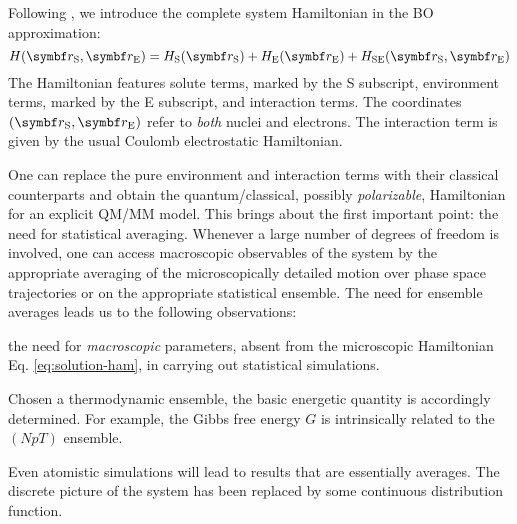 Following \citeauthor{Tomasi2007-es}, we introduce the complete system
Hamiltonian in the \acrshort{BO} approximation:\autocite{Tomasi2004-dc,
Tomasi2007-es}
\begin{equation}\label{eq:solution-ham}
 H(\vect{r}_\mathrm{S}, \vect{r}_\mathrm{E}) =
  H_\mathrm{S}(\vect{r}_\mathrm{S}) +  H_\mathrm{E}(\vect{r}_\mathrm{E})
+ H_\mathrm{SE}(\vect{r}_\mathrm{S}, \vect{r}_\mathrm{E})
\end{equation}
The Hamiltonian features solute terms, marked by the S subscript,
environment terms, marked by the E subscript, and interaction terms.
The coordinates $(\vect{r}_\mathrm{S}, \vect{r}_\mathrm{E})$ refer to
\emph{both} nuclei and electrons.
The interaction term is given by the usual Coulomb electrostatic
Hamiltonian.

One can replace the pure environment and interaction terms with their
classical counterparts and obtain the quantum/classical, possibly
\emph{polarizable}, Hamiltonian for an explicit \acrshort{QM}/\acrshort{MM} model.
This brings about the first important point: the need for statistical
averaging.
Whenever a large number of degrees of freedom is involved, one can
access macroscopic observables of the system by the appropriate
averaging of the microscopically detailed motion over phase space
trajectories or on the appropriate statistical
ensemble.\autocite{Hill1960-ql}
The need for ensemble averages leads us to the following observations:
\begin{enumerate*}[label={\alph*)},font={\color{PMS1797}}]
 \item
   the need for \emph{macroscopic} parameters, absent from the
   microscopic Hamiltonian Eq. \eqref{eq:solution-ham}, in carrying out
   statistical simulations.
 \item
   Chosen a thermodynamic ensemble, the basic energetic quantity is
   accordingly determined. For example, the Gibbs free energy  $G$ is
   intrinsically related to the $(NpT)$ ensemble.
 \item
   Even atomistic simulations will lead to results that are essentially
   averages. The discrete picture of the system has been replaced by
   some continuous distribution function.
\end{enumerate*}

